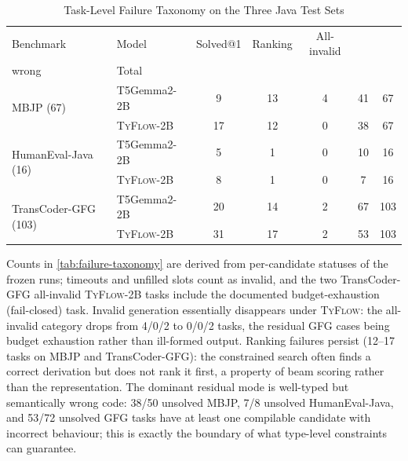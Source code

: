 \documentclass[manuscript,screen]{acmart}
\newcommand{\toolname}[1]{\textsc{#1}}
\newcommand{\mainname}{\toolname{TyFlow}\xspace}
\begin{document}
\begin{table}[ht]
\centering
\begin{threeparttable}
\caption{{\color{revblue}Task-Level Failure Taxonomy on the Three Java Test Sets}}
\label{tab:failure-taxonomy}
\begin{tabular}{
    l
    l
    c
    c
    c
    c
    c
}
\toprule
{\color{revblue}Benchmark }& {\color{revblue}Model }& {{\color{revblue}Solved@1}} & {{\color{revblue}Ranking}} & {{\color{revblue}All-invalid}} & {\shortstack{{\color{revblue}Well-typed}\\{\color{revblue}wrong}}} & {{\color{revblue}Total}} \\
\midrule
\multirow{2}{*}{MBJP (67)}
        & {\color{revblue}T5Gemma2-2B }& {\color{revblue}9 }& {\color{revblue}13 }& {\color{revblue}4 }& {\color{revblue}41 }& {\color{revblue}67 }\\
        & \mainname{\color{revblue}-2B }& {\color{revblue}17 }& {\color{revblue}12 }& {\color{revblue}0 }& {\color{revblue}38 }& {\color{revblue}67 }\\
\midrule
\multirow{2}{*}{HumanEval-Java (16)}
        & {\color{revblue}T5Gemma2-2B }& {\color{revblue}5 }& {\color{revblue}1 }& {\color{revblue}0 }& {\color{revblue}10 }& {\color{revblue}16 }\\
        & \mainname{\color{revblue}-2B }& {\color{revblue}8 }& {\color{revblue}1 }& {\color{revblue}0 }& {\color{revblue}7 }& {\color{revblue}16 }\\
\midrule
\multirow{2}{*}{TransCoder-GFG (103)}
        & {\color{revblue}T5Gemma2-2B }& {\color{revblue}20 }& {\color{revblue}14 }& {\color{revblue}2 }& {\color{revblue}67 }& {\color{revblue}103 }\\
        & \mainname{\color{revblue}-2B }& {\color{revblue}31 }& {\color{revblue}17 }& {\color{revblue}2 }& {\color{revblue}53 }& {\color{revblue}103 }\\
\bottomrule
\end{tabular}
\end{threeparttable}
\end{table}

{\color{revblue}Counts in }\autoref{tab:failure-taxonomy} {\color{revblue}are derived from per-candidate statuses of the frozen runs; timeouts and unfilled slots count as invalid, and the two TransCoder-GFG all-invalid }\mainname{\color{revblue}-2B tasks include the documented budget-exhaustion (fail-closed) task.
Invalid generation essentially disappears under }\mainname{}{\color{revblue}: the all-invalid category drops from 4/0/2 to 0/0/2 tasks, the residual GFG cases being budget exhaustion rather than ill-formed output.
Ranking failures persist (12--17 tasks on MBJP and TransCoder-GFG): the constrained search often finds a correct derivation but does not rank it first, a property of beam scoring rather than the representation.
The dominant residual mode is well-typed but semantically wrong code: 38/50 unsolved MBJP, 7/8 unsolved HumanEval-Java, and 53/72 unsolved GFG tasks have at least one compilable candidate with incorrect behaviour; this is exactly the boundary of what type-level constraints can guarantee.
}
\end{document}
